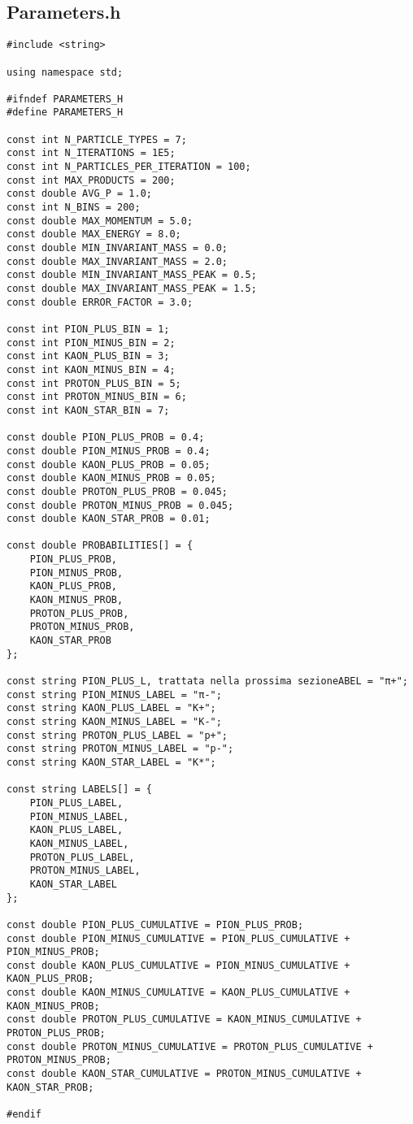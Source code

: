 \documentclass{article}
\begin{document}
\subsection*{Parameters.h}
\begin{verbatim}
#include <string>

using namespace std;

#ifndef PARAMETERS_H
#define PARAMETERS_H

const int N_PARTICLE_TYPES = 7;
const int N_ITERATIONS = 1E5;
const int N_PARTICLES_PER_ITERATION = 100;
const int MAX_PRODUCTS = 200;
const double AVG_P = 1.0;
const int N_BINS = 200;
const double MAX_MOMENTUM = 5.0;
const double MAX_ENERGY = 8.0;
const double MIN_INVARIANT_MASS = 0.0;
const double MAX_INVARIANT_MASS = 2.0;
const double MIN_INVARIANT_MASS_PEAK = 0.5;
const double MAX_INVARIANT_MASS_PEAK = 1.5;
const double ERROR_FACTOR = 3.0;

const int PION_PLUS_BIN = 1;
const int PION_MINUS_BIN = 2;
const int KAON_PLUS_BIN = 3;
const int KAON_MINUS_BIN = 4;
const int PROTON_PLUS_BIN = 5;
const int PROTON_MINUS_BIN = 6;
const int KAON_STAR_BIN = 7;

const double PION_PLUS_PROB = 0.4;
const double PION_MINUS_PROB = 0.4;
const double KAON_PLUS_PROB = 0.05;
const double KAON_MINUS_PROB = 0.05;
const double PROTON_PLUS_PROB = 0.045;
const double PROTON_MINUS_PROB = 0.045;
const double KAON_STAR_PROB = 0.01;

const double PROBABILITIES[] = {
    PION_PLUS_PROB,
    PION_MINUS_PROB,
    KAON_PLUS_PROB,
    KAON_MINUS_PROB,
    PROTON_PLUS_PROB,
    PROTON_MINUS_PROB,
    KAON_STAR_PROB
};

const string PION_PLUS_L, trattata nella prossima sezioneABEL = "π+";
const string PION_MINUS_LABEL = "π-";
const string KAON_PLUS_LABEL = "K+";
const string KAON_MINUS_LABEL = "K-";
const string PROTON_PLUS_LABEL = "p+";
const string PROTON_MINUS_LABEL = "p-";
const string KAON_STAR_LABEL = "K*";

const string LABELS[] = {
    PION_PLUS_LABEL,
    PION_MINUS_LABEL,
    KAON_PLUS_LABEL,
    KAON_MINUS_LABEL,
    PROTON_PLUS_LABEL,
    PROTON_MINUS_LABEL,
    KAON_STAR_LABEL
};

const double PION_PLUS_CUMULATIVE = PION_PLUS_PROB;
const double PION_MINUS_CUMULATIVE = PION_PLUS_CUMULATIVE + PION_MINUS_PROB;
const double KAON_PLUS_CUMULATIVE = PION_MINUS_CUMULATIVE + KAON_PLUS_PROB;
const double KAON_MINUS_CUMULATIVE = KAON_PLUS_CUMULATIVE + KAON_MINUS_PROB;
const double PROTON_PLUS_CUMULATIVE = KAON_MINUS_CUMULATIVE + PROTON_PLUS_PROB;
const double PROTON_MINUS_CUMULATIVE = PROTON_PLUS_CUMULATIVE + PROTON_MINUS_PROB;
const double KAON_STAR_CUMULATIVE = PROTON_MINUS_CUMULATIVE + KAON_STAR_PROB;

#endif
\end{verbatim}
\end{document}
